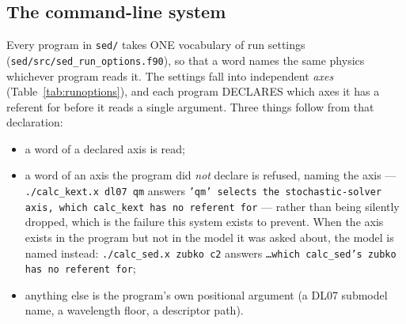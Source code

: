 \documentclass{my_memo}
\newcommand{\code}[1]{\texttt{#1}}
\begin{document}
\subsection{The command-line system}\label{sec:standalone:options}

Every program in \code{sed/} takes ONE vocabulary of run settings
(\code{sed/src/sed\_run\_options.f90}), so that a word names the same physics
whichever program reads it. The settings fall into independent \emph{axes}
(Table~\ref{tab:runoptions}), and each program DECLARES which axes it has a
referent for before it reads a single argument. Three things follow from that
declaration:

\begin{itemize}
\item a word of a declared axis is read;
\item a word of an axis the program did \emph{not} declare is refused, naming
      the axis --- \code{./calc\_kext.x dl07 qm} answers \code{'qm' selects the
      stochastic-solver axis, which calc\_kext has no referent for} --- rather
      than being silently dropped, which is the failure this system exists to
      prevent. When the axis exists in the program but not in the model it was
      asked about, the model is named instead: \code{./calc\_sed.x zubko c2}
      answers \code{\ldots which calc\_sed's zubko has no referent for};
\item anything else is the program's own positional argument (a DL07 submodel
      name, a wavelength floor, a descriptor path).
\end{itemize}
\end{document}
